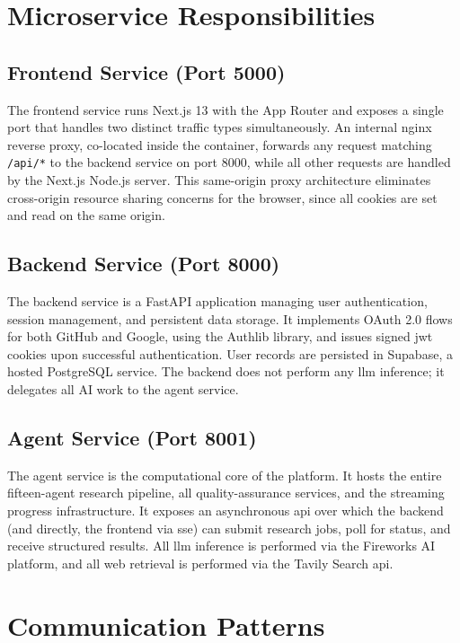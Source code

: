 \documentclass[12pt,a4paper,oneside]{book}
\begin{document}
\section{Microservice Responsibilities}

\subsection{Frontend Service (Port 5000)}

The frontend service runs Next.js 13 with the App Router and exposes a single port that handles two distinct traffic types simultaneously. An internal nginx reverse proxy, co-located inside the container, forwards any request matching \texttt{/api/*} to the backend service on port 8000, while all other requests are handled by the Next.js Node.js server. This same-origin proxy architecture eliminates cross-origin resource sharing concerns for the browser, since all cookies are set and read on the same origin.

\subsection{Backend Service (Port 8000)}

The backend service is a FastAPI application managing user authentication, session management, and persistent data storage. It implements OAuth 2.0 flows for both GitHub and Google, using the Authlib library, and issues signed \gls{jwt} cookies upon successful authentication. User records are persisted in Supabase, a hosted PostgreSQL service. The backend does not perform any \gls{llm} inference; it delegates all AI work to the agent service.

\subsection{Agent Service (Port 8001)}

The agent service is the computational core of the platform. It hosts the entire fifteen-agent research pipeline, all quality-assurance services, and the streaming progress infrastructure. It exposes an asynchronous \gls{api} over which the backend (and directly, the frontend via \gls{sse}) can submit research jobs, poll for status, and receive structured results. All \gls{llm} inference is performed via the Fireworks AI platform, and all web retrieval is performed via the Tavily Search \gls{api}.

\section{Communication Patterns}
\end{document}
